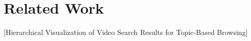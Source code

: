 \chapter{Related Work}
[Hierarchical Visualization of Video Search Results for Topic-Based Browsing]